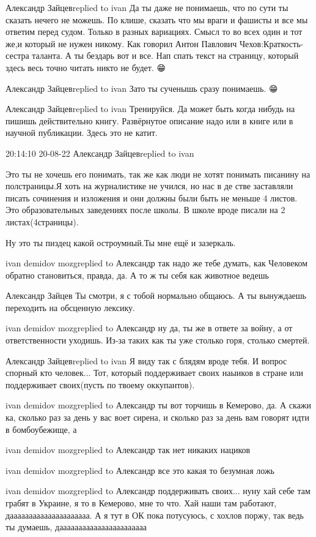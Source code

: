  
 
 
 
 

Александр Зайцевreplied to ivan
Да ты даже не понимаешь, что по сути ты сказать нечего не можешь. По клише, сказать что мы враги и фашисты и все мы ответим перед судом. Только в разных вариациях. Смысл то во всех один и тот же,и который не нужен никому. Как говорил Антон Павлович Чехов:Краткость-сестра таланта. А ты бездарь вот и все. Нап спать текст на страницу, который здесь весь точно читать никто не будет. 😁

Александр Зайцевreplied to ivan
Зато ты сученышь сразу понимаешь. 😁

Александр Зайцевreplied to ivan
Тренируйся. Да может быть когда нибудь на пишишь действительно книгу. Развёрнутое описание надо или в книге или в научной публикации. Здесь это не катит.

20:14:10 20-08-22
Александр Зайцевreplied to ivan

Это ты не хочешь его понимать, так же как люди не хотят понимать писанину на
полстраницы.Я хоть на журналистике не учился, но нас в де стве заставляли
писать сочинения и изложения и они должны были быть не меньше 4 листов. Это
образовательных заведениях после школы. В школе вроде писали на 2
листах(4страницы).

Ну это ты пиздец какой остроумный.Ты мне ещё и зазеркаль.

ivan demidov mozgreplied to Александр
так надо же тебе думать, как Человеком обратно становиться, правда, да. А то ж ты себя как животное ведешь

Александр Зайцев
Ты смотри, я с тобой нормально общаюсь. А ты вынуждаешь переходить на обсценную лексику.

ivan demidov mozgreplied to Александр
ну да, ты же в ответе за войну, а от ответственности уходишь. Из-за таких как ты уже столько горя, столько смертей.

Александр Зайцевreplied to ivan
Я виду так с блядям вроде тебя. И вопрос спорный кто человек... Тот, который поддерживает своих наыиков в стране или поддерживает своих(пусть по твоему оккупантов).

ivan demidov mozgreplied to Александр
ты вот торчишь в Кемерово, да. А скажи ка, сколько раз за день у вас воет сирена, и сколько раз за день вам говорят идти в бомбоубежище, а

ivan demidov mozgreplied to Александр
так нет никаких нациков

ivan demidov mozgreplied to Александр
все это какая то безумная ложь

ivan demidov mozgreplied to Александр
поддерживать своих... нуну хай себе там грабят в Украине, я то в Кемерово, мне то что. Хай наши там работают, дааааааааааааааааааааа. А я тут в ОК пока потусуюсь, с хохлов поржу, так ведь ты думаешь, дааааааааааааааааааааааа
